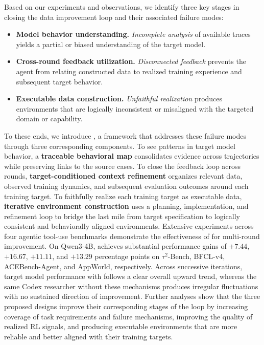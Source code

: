 Based on our experiments and observations, we identify three key stages in closing the data improvement loop and their associated failure modes:

\begin{itemize}
\item \textbf{Model behavior understanding.} \emph{Incomplete analysis} of available traces yields a partial or biased understanding of the target model.

\item \textbf{Cross-round feedback utilization.} \emph{Disconnected feedback} prevents the agent from relating constructed data to realized training experience and subsequent target behavior.

\item \textbf{Executable data construction.} \emph{Unfaithful realization} produces environments that are logically inconsistent or misaligned with the targeted domain or capability.
\end{itemize}

To these ends, we introduce \method{}, a framework that addresses these failure modes through three corresponding components. To see patterns in target model behavior, a \textbf{traceable behavioral map} consolidates evidence across trajectories while preserving links to the source cases. To close the feedback loop across rounds, \textbf{target-conditioned context refinement} organizes relevant data, observed training dynamics, and subsequent evaluation outcomes around each training target. To faithfully realize each training target as executable data, \textbf{iterative environment construction} uses a planning, implementation, and refinement loop to bridge the last mile from target specification to logically consistent and behaviorally aligned environments.
Extensive experiments across four agentic tool-use benchmarks demonstrate the effectiveness of \method{} for multi-round improvement. On Qwen3-4B, \method{} achieves substantial performance gains of $+7.44$, $+16.67$, $+11.11$, and $+13.29$ percentage points on $\tau^2$-Bench, BFCL-v4, ACEBench-Agent, and AppWorld, respectively. Across successive iterations, target model performance with \method{} follows a clear overall upward trend, whereas the same Codex researcher without these mechanisms produces irregular fluctuations with no sustained direction of improvement. Further analyses show that the three proposed designs improve their corresponding stages of the loop by increasing coverage of task requirements and failure mechanisms, improving the quality of realized RL signals, and producing executable environments that are more reliable and better aligned with their training targets.






